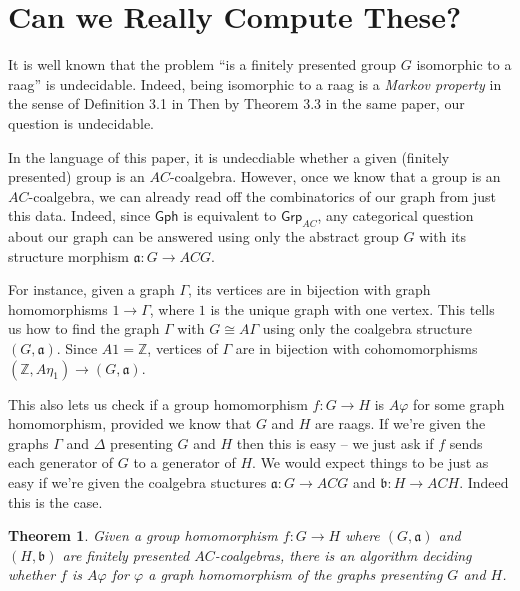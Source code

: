 \documentclass[12pt]{article}
\newtheorem{thm}{Theorem}
\theoremstyle{definition}
\theoremstyle{theorem}
\newcommand*{\catFont}[1]{\mathsf{#1}}
\newcommand{\Grp}{\catFont{Grp}}
\begin{document}
\section{Can we Really Compute These?}
\label{computing}

It is well known that the problem 
``is a finitely presented group $G$ isomorphic to a raag'' 
is undecidable. Indeed, being isomorphic to a raag is a 
\emph{Markov property} in the sense of Definition 3.1 in \cite{millerDecisionProblemsGroups1992}
Then by Theorem 3.3 in the same paper, our question is undecidable.

In the language of this paper, it is undecdiable whether a given
(finitely presented) group is an $AC$-coalgebra. However, once we know
that a group is an $AC$-coalgebra, we can already read off the combinatorics
of our graph from just this data. Indeed, since $\mathsf{Gph}$ is equivalent
to $\Grp_{AC}$, any categorical question about our graph can be answered 
using only the abstract group $G$ with its structure morphism $\mathfrak{a} : G \to ACG$.

For instance, given a graph $\Gamma$, its vertices are in bijection with
graph homomorphisms $1 \to \Gamma$, where $1$ is the unique graph with one vertex.
This tells us how to find the graph $\Gamma$ with $G \cong A\Gamma$ using
only the coalgebra structure $(G,\mathfrak{a})$. Since $A 1 = \mathbb{Z}$,
vertices of $\Gamma$ are in bijection with cohomomorphisms 
$(\mathbb{Z}, A \eta_1) \to (G, \mathfrak{a})$. 

This also lets us check if a group homomorphism $f : G \to H$ is
$A \varphi$ for some graph homomorphism, provided we know that $G$ 
and $H$ are raags. If we're given the graphs $\Gamma$ and $\Delta$
presenting $G$ and $H$ then this is easy -- we just ask if $f$ sends 
each generator of $G$ to a generator of $H$. We would expect things to
be just as easy if we're given the coalgebra stuctures 
$\mathfrak{a} : G \to ACG$ and $\mathfrak{b} : H \to ACH$. Indeed this is the case.

\begin{thm}
  Given a group homomorphism $f : G \to H$ where $(G,\mathfrak{a})$ and $(H,\mathfrak{b})$
    are finitely presented $AC$-coalgebras, there is an algorithm deciding 
    whether $f$ is $A \varphi$ for $\varphi$ a graph homomorphism of the graphs 
    presenting $G$ and $H$.
\end{thm}
\end{document}
